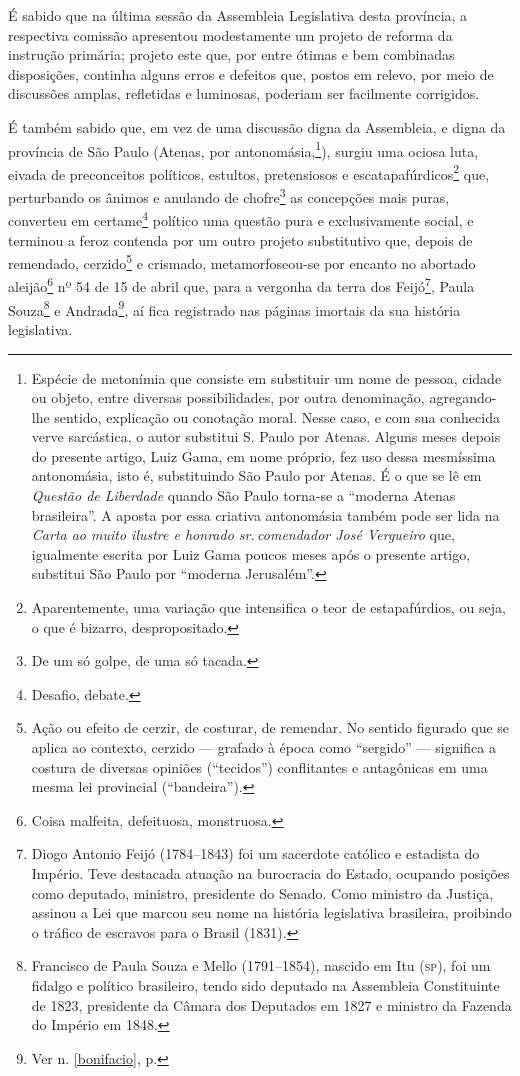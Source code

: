É sabido que na última sessão da Assembleia Legislativa desta província,
a respectiva comissão apresentou modestamente um projeto de reforma da
instrução primária; projeto este que, por entre ótimas e bem combinadas
disposições, continha alguns erros e defeitos que, postos em relevo, por
meio de discussões amplas, refletidas e luminosas, poderiam ser
facilmente corrigidos.

É também sabido que, em vez de uma discussão digna da Assembleia, e
digna da província de São Paulo (Atenas, por antonomásia,\footnote{
  Espécie de metonímia que consiste em substituir um nome de pessoa,
  cidade ou objeto, entre diversas possibilidades, por outra
  denominação, agregando-lhe sentido, explicação ou conotação moral.
  Nesse caso, e com sua conhecida verve sarcástica, o autor substitui S.
  Paulo por Atenas. Alguns meses depois do presente artigo, Luiz Gama,
  em nome próprio, fez uso dessa mesmíssima antonomásia, isto é,
  substituindo São Paulo por Atenas. É o que se lê em \emph{Questão de
  Liberdade} quando São Paulo torna-se a ``moderna Atenas brasileira''. A
  aposta por essa criativa antonomásia também pode ser lida na
  \emph{Carta ao muito ilustre e honrado sr.\,comendador José Vergueiro}
  que, igualmente escrita por Luiz Gama poucos meses após o presente
  artigo, substitui São Paulo por ``moderna Jerusalém''.}), surgiu uma
ociosa luta, eivada de preconceitos políticos, estultos, pretensiosos e
escatapafúrdicos\footnote{Aparentemente, uma variação que intensifica
  o teor de estapafúrdios, ou seja, o que é bizarro, despropositado.}
que, perturbando os ânimos e anulando de chofre\footnote{De um só
  golpe, de uma só tacada.} as concepções mais puras, converteu em
certame\footnote{Desafio, debate.} político uma questão pura e
exclusivamente social, e terminou a feroz contenda por um outro projeto
substitutivo que, depois de remendado, cerzido\footnote{Ação ou efeito
  de cerzir, de costurar, de remendar. No sentido figurado que se aplica
  ao contexto, cerzido --- grafado à época como ``sergido'' --- significa a
  costura de diversas opiniões (``tecidos'') conflitantes e antagônicas em
  uma mesma lei provincial (``bandeira'').} e crismado, metamorfoseou-se
por encanto no abortado aleijão\footnote{Coisa malfeita, defeituosa,
  monstruosa.} nº 54 de 15 de abril que, para a vergonha da terra dos
Feijó\footnote{Diogo Antonio Feijó (1784--1843) foi um sacerdote
  católico e estadista do Império. Teve destacada atuação na burocracia
  do Estado, ocupando posições como deputado, ministro, presidente do
  Senado. Como ministro da Justiça, assinou a Lei que marcou seu nome na
  história legislativa brasileira, proibindo o tráfico de escravos para
  o Brasil (1831).}, Paula Souza\footnote{Francisco de Paula Souza e
  Mello (1791--1854), nascido em Itu (\textsc{sp}), foi um fidalgo e político
  brasileiro, tendo sido deputado na Assembleia Constituinte de 1823,
  presidente da Câmara dos Deputados em 1827 e ministro da Fazenda do
  Império em 1848.} e Andrada\footnote{Ver n. \ref{bonifacio}, p. \pageref{bonifacio}}, 
  aí fica registrado nas páginas imortais da sua história legislativa.

